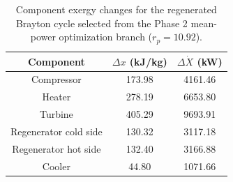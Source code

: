 \begin{table}[htbp]
    \centering
    \caption{Component exergy changes for the regenerated Brayton cycle selected from the Phase 2 mean-power optimization branch ($r_p = 10.92$).}
    \label{tab:phase5_component_exergy_phase2_optimization}
    \begin{tabular}{c c c}
        \hline
        Component & $\Delta x$ (kJ/kg) & $\Delta \dot{X}$ (kW) \\
        \hline
        Compressor & 173.98 & 4161.46 \\
        Heater & 278.19 & 6653.80 \\
        Turbine & 405.29 & 9693.91 \\
        Regenerator cold side & 130.32 & 3117.18 \\
        Regenerator hot side & 132.40 & 3166.88 \\
        Cooler & 44.80 & 1071.66 \\
        \hline
    \end{tabular}
\end{table}